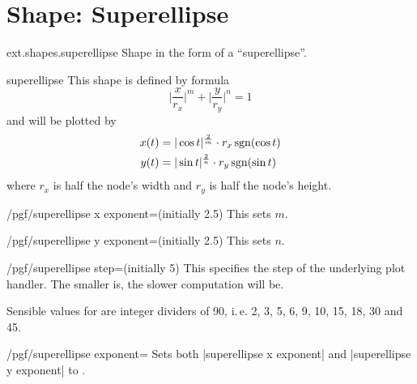 %
%
%

\section{Shape: Superellipse}
\begin{pgflibrary}{ext.shapes.superellipse}
  Shape in the form of a ``superellipse''.
\end{pgflibrary}

\begin{shape}{superellipse}
This shape is defined by formula
\begin{equation*}
  \biggl|\frac x{r_x}\biggr|^m + \biggl|\frac y{r_y}\biggr|^n = 1
\end{equation*}
and will be plotted by
\begin{align*}
  x(t) &= |\cos t|^{\frac 2m} \cdot r_x \operatorname{sgn}(\cos t) \\
  y(t) &= |\sin t|^{\frac 2n} \cdot r_y \operatorname{sgn}(\sin t) \\
\end{align*}
where $r_x$ is half the node's width and $r_y$ is half the node's height.

\begin{key}{/pgf/superellipse x exponent=(initially 2.5)}
This sets $m$.
\end{key}
\begin{key}{/pgf/superellipse y exponent=(initially 2.5)}
This sets $n$.
\end{key}
\begin{key}{/pgf/superellipse step=(initially 5)}
This specifies the step of the underlying plot handler.
The smaller  is, the slower computation will be.

Sensible values for  are integer dividers of 90, i.\,e.
2, 3, 5, 6, 9, 10, 15, 18, 30 and 45.
\end{key}
\begin{key}{/pgf/superellipse exponent=}
  Sets both |superellipse x exponent| and |superellipse y exponent| to .
\end{key}


\end{shape}
